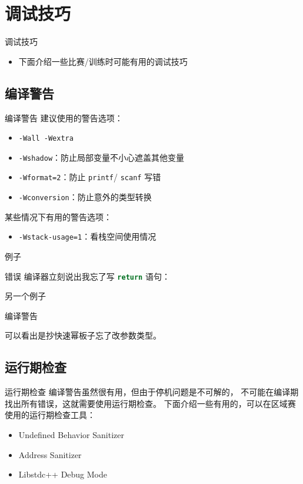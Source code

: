 \documentclass[10pt,mathserif]{beamer}
\begin{document}
\section{调试技巧}
\begin{frame}{调试技巧}
	\begin{itemize}
		\item 下面介绍一些比赛/训练时可能有用的调试技巧
	\end{itemize}
\end{frame}

\subsection{编译警告}
\begin{frame}{编译警告}
	建议使用的警告选项：
	\begin{itemize}
		\item \lstinline|-Wall -Wextra|
		\item \lstinline|-Wshadow|：防止局部变量不小心遮盖其他变量
		\item \lstinline|-Wformat=2|：防止 \lstinline|printf|/
			\lstinline|scanf| 写错
		\item \lstinline|-Wconversion|：防止意外的类型转换
	\end{itemize}
	某些情况下有用的警告选项：
	\begin{itemize}
		\item \lstinline|-Wstack-usage=1|：看栈空间使用情况
	\end{itemize}
\end{frame}

\begin{frame}{例子}
	
\end{frame}

\begin{frame}{错误}
	编译器立刻说出我忘了写 \lstinline[language=C++]!return! 语句：
	
\end{frame}

\begin{frame}{另一个例子}
	
\end{frame}

\begin{frame}{编译警告}
	
	可以看出是抄快速幂板子忘了改参数类型。
\end{frame}

\subsection{运行期检查}
\begin{frame}{运行期检查}
	编译警告虽然很有用，但由于停机问题是不可解的，
	不可能在编译期找出所有错误，这就需要使用运行期检查。
	下面介绍一些有用的，可以在区域赛使用的运行期检查工具：
	\begin{itemize}
		\item Undefined Behavior Sanitizer
		\item Address Sanitizer
		\item Libstdc++ Debug Mode
	\end{itemize}
\end{frame}
\end{document}
